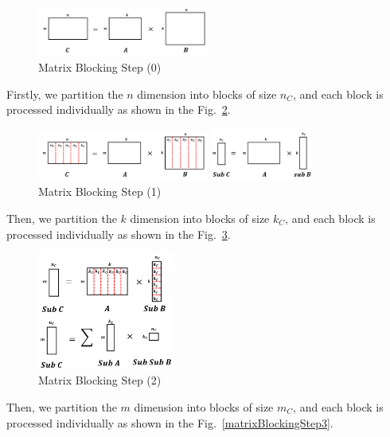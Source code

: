 \documentclass[conference]{IEEEtran}
\begin{document}
	 \begin{figure}[htbp]
	 	\centerline{\includegraphics[width=0.5\textwidth]{fig2.png}}
	 	\caption{Matrix Blocking Step (0)}
	 	\label{matrixBlockingStep0}
	 \end{figure}
 
 	Firstly, we partition the $n$ dimension into blocks of size $n_C$, and each block is processed individually as shown in the Fig.~\ref{matrixBlockingStep1}.
 	
	\begin{figure}[htbp]
		\centerline{\includegraphics[width=0.5\textwidth]{fig3.png}}
		\centerline{\includegraphics[width=0.3\textwidth]{fig3-2.png}}
		\caption{Matrix Blocking Step (1)}
		\label{matrixBlockingStep1}
	\end{figure} 

 	Then, we partition the $k$ dimension into blocks of size $k_C$, and each block is processed individually as shown in the Fig.~\ref{matrixBlockingStep2}.
	
	\begin{figure}[htbp]
		\centerline{\includegraphics[width=0.4\textwidth]{fig4.png}}
		\caption{Matrix Blocking Step (2)}
		\label{matrixBlockingStep2}
	\end{figure}

 	Then, we partition the $m$ dimension into blocks of size $m_C$, and each block is processed individually as shown in the Fig.~\ref{matrixBlockingStep3}.
 	
\end{document}
